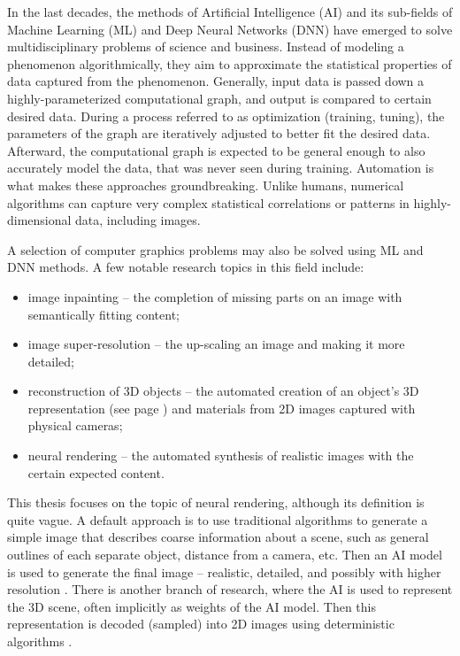 In the last decades, the methods of Artificial Intelligence (AI) and its sub-fields of Machine Learning (ML) and Deep Neural Networks (DNN) have emerged to solve multidisciplinary problems of science and business. Instead of modeling a phenomenon algorithmically, they aim to approximate the statistical properties of data captured from the phenomenon. Generally, input data is passed down a highly-parameterized computational graph, and output is compared to certain desired data. During a process referred to as optimization (training, tuning), the parameters of the graph are iteratively adjusted to better fit the desired data. Afterward, the computational graph is expected to be general enough to also accurately model the data, that was never seen during training. Automation is what makes these approaches groundbreaking. Unlike humans, numerical algorithms can capture very complex statistical correlations or patterns in highly-dimensional data, including images.

A selection of computer graphics problems may also be solved using ML and DNN methods. A few notable research topics in this field include:
\begin{itemize}
\item image inpainting -- the completion of missing parts on an image with semantically fitting content;
\item image super-resolution -- the up-scaling an image and making it more detailed;
\item reconstruction of 3D objects -- the automated creation of an object's 3D representation (see page \pageref{intro:3d-representations-paragraph}) and materials from 2D images captured with physical cameras;
\item neural rendering -- the automated synthesis of realistic images with the certain expected content.
\end{itemize}

This thesis focuses on the topic of neural rendering, although its definition is quite vague. A default approach is to use traditional algorithms to generate a simple image that describes coarse information about a scene, such as general outlines of each separate object, distance from a camera, etc. Then an AI model is used to generate the final image -- realistic, detailed, and possibly with higher resolution \cite{dnn:deferred19}. There is another branch of research, where the AI is used to represent the 3D scene, often implicitly as weights of the AI model. Then this representation is decoded (sampled) into 2D images using deterministic algorithms \cite{dnn:nerf20}.
 
